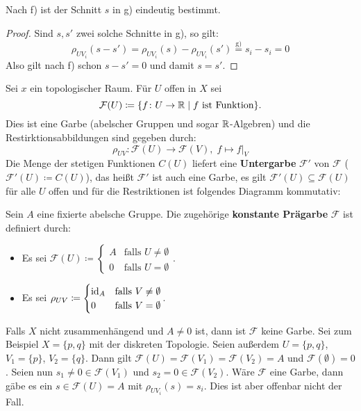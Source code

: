 \begin{bem}
	Nach f) ist der Schnitt $s$ in g) eindeutig bestimmt.
	\begin{proof}
		Sind $s, s'$ zwei solche Schnitte in g), so gilt:
		\[
			\rho_{UV_i}(s-s') = \rho_{UV_i}(s) - \rho_{UV_i}(s') \overset{\text{g)}}{=}s_i-s_i = 0 
		\]
		Also gilt nach f) schon $s-s'=0$ und damit $s=s'$.
	\end{proof}
\end{bem}

\begin{bsp}
\label{bsp:1.5}
	Sei $x$ ein topologischer Raum. Für $U$ offen in $X$ sei
	\[
		\mathcal{F}(U)\coloneqq \{f\colon U\to \mathbb {R} \mid f \text{ ist Funktion}\}.
	\]
	Dies ist eine Garbe (abelscher Gruppen und sogar $\mathbb {R}$-Algebren) und die Restirktionsabbildungen sind gegeben durch:
	\[
		\rho_{UV}\colon\mathcal{F}(U) \to \mathcal{F}(V),\; f \mapsto f\vert_V
	\]
	Die Menge der stetigen Funktionen $C(U)$ liefert eine \textbf{Untergarbe} $\mathcal{F}'$ von $\mathcal{F}$ ($\mathcal{F}'(U)\coloneqq C(U)$), das heißt $\mathcal{F}'$ ist auch eine Garbe, es gilt $\mathcal{F}'(U)\subseteq \mathcal{F}(U)$ für alle $U$ offen und für die Restriktionen ist folgendes Diagramm kommutativ:
	\begin{center}
	\end{center}

\end{bsp}

\begin{bsp}
	Sein $A$ eine fixierte abelsche Gruppe. Die zugehörige \textbf{konstante Prägarbe} $\mathcal{F}$ ist definiert durch:
	\begin{itemize}
		\item Es sei $\mathcal{F}(U) \coloneqq \begin{cases}A & \text{falls } U \neq \emptyset\\0& \text{falls } U = \emptyset\end{cases}$.
		\item Es sei $\rho_{UV} \coloneqq \begin{cases}\operatorname{id}_A & \text{falls } V \neq \emptyset\\0& \text{falls } V = \emptyset\end{cases}$.
	\end{itemize}
	Falls $X$ nicht zusammenhängend und $A \neq 0$ ist, dann ist $\mathcal{F}$ keine Garbe. Sei zum Beispiel $X=\{p,q\}$ mit der diskreten Topologie. Seien außerdem $U=\{p,q\}$, $V_1=\{p\}$, $V_2=\{q\}$. Dann gilt $\mathcal{F}(U)=\mathcal{F}(V_1)=\mathcal{F}(V_2) = A$ und $\mathcal{F}(\emptyset)=0$. Seien nun $s_1 \neq 0 \in \mathcal{F}(V_1)$ und $s_2 = 0 \in \mathcal{F}(V_2)$. Wäre $\mathcal{F}$ eine Garbe, dann gäbe es ein $s \in \mathcal{F}(U) = A$ mit $\rho_{UV_i}(s) = s_i$. Dies ist aber offenbar nicht der Fall.
\end{bsp}

